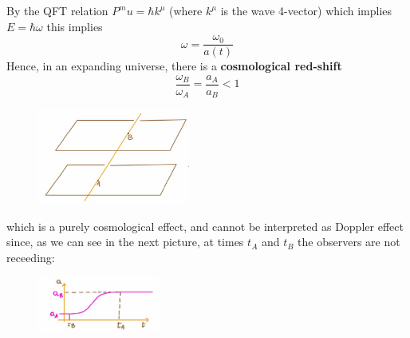 \documentclass[../main/main.tex]{subfiles}
\begin{document}
\begin{example}
By the QFT relation $P^mu=\hbar k^\mu$ (where $k^\mu$ is the wave 4-vector) which implies $E=\hbar\omega$ this implies
\begin{equation}
\omega=\frac{\omega_0}{a(t)}
\end{equation}
Hence, in an expanding universe, there is a \textbf{cosmological red-shift}
\begin{equation}\boxed{
\frac{\omega_B}{\omega_A}=\frac{a_A}{a_B}<1
}\end{equation}
%
\begin{figure}[H]
\centering
\includegraphics[width=5cm]{../img/cosmological-redshift-1.jpg}
\end{figure}
\noindent
which is a purely cosmological effect, and cannot be interpreted as Doppler effect since, as we can see in the next picture, at times $t_A$ and $t_B$ the observers are not receeding:
\begin{figure}[H]
\centering
\includegraphics[width=4cm]{../img/cosmological-redshift-2.jpg}
\end{figure}

\end{example}
\end{document}
